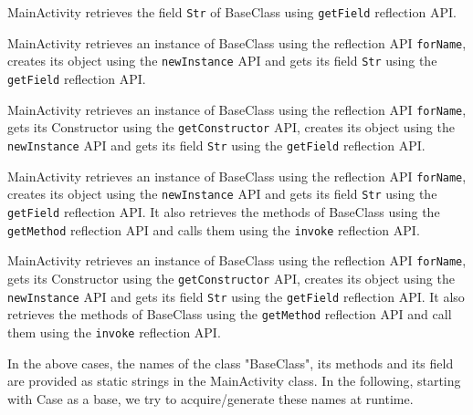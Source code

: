 
\iffalse
\begin{description}[style=unboxed,leftmargin=0cm]

\item {} MainActivity retrieves the  field \texttt{Str} of BaseClass using \texttt{getField} reflection API. %

\item {} MainActivity retrieves an instance of BaseClass using the reflection API \texttt{forName}, creates its object using the \texttt{newInstance} API and gets its field \texttt{Str} using the \texttt{getField} reflection API. %


\item {} MainActivity retrieves an instance of BaseClass using the reflection API \texttt{forName}, gets its Constructor using the \texttt{getConstructor} API, creates its object using the \texttt{newInstance} API and gets its field \texttt{Str} using the \texttt{getField} reflection API. %

\item {} MainActivity retrieves an instance of BaseClass using the reflection API \texttt{forName}, creates its object using the \texttt{newInstance} API and gets its field \texttt{Str} using the \texttt{getField} reflection API. It also retrieves the methods of BaseClass using the \texttt{getMethod} reflection API and calls them using the \texttt{invoke} reflection API. %

\item {} MainActivity retrieves an instance of BaseClass using the reflection API \texttt{forName}, gets its Constructor using the \texttt{getConstructor} API, creates its object using the \texttt{newInstance} API and gets its field \texttt{Str} using the \texttt{getField} reflection API. It also retrieves the methods of BaseClass using the \texttt{getMethod} reflection API and call them using the \texttt{invoke} reflection API. %

In the above cases, the names of the class "BaseClass", its methods and its field are provided as static strings in the MainActivity class. In the following, starting with Case  as a base, we try to acquire/generate these names at runtime.


\end{description}
